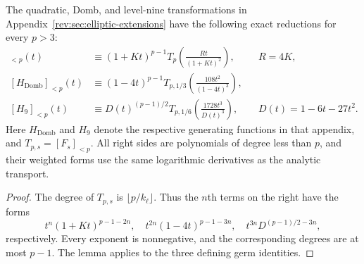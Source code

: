 \begin{proposition}
\label{prop:three-finite-transformations}
The quadratic, Domb, and level-nine transformations in
Appendix~\ref{rev:sec:elliptic-extensions} have the following exact
reductions for every $p>3$:
\begin{align}
 [\mathcal G]_{<p}(t)
 &\equiv(1+Kt)^{p-1}T_p\!\left(\frac{Rt}{(1+Kt)^2}\right),
 &&R=4K,\label{eq:finite-quadratic}\\
 [H_{\mathrm{Domb}}]_{<p}(t)
 &\equiv(1-4t)^{p-1}T_{p,1/3}\!\left(\frac{108t^2}{(1-4t)^3}\right),
 \label{eq:finite-domb}\\
 [H_9]_{<p}(t)
 &\equiv D(t)^{(p-1)/2}T_{p,1/6}\!\left(\frac{1728t^3}{D(t)^3}\right),
 &&D(t)=1-6t-27t^2.\label{eq:finite-nine}
\end{align}
Here $H_{\mathrm{Domb}}$ and $H_9$ denote the respective generating
functions in that appendix, and $T_{p,s}=[F_s]_{<p}$.
All right sides are polynomials of degree less than $p$, and their
weighted forms use the same logarithmic derivatives as the analytic
transport.
\end{proposition}
\begin{proof}
The degree of $T_{p,s}$ is $\lfloor p/k_\ell\rfloor$. Thus the
$n$th terms on the right have the forms
\[
 t^n(1+Kt)^{p-1-2n},\quad
 t^{2n}(1-4t)^{p-1-3n},\quad
 t^{3n}D^{(p-1)/2-3n},
\]
respectively. Every exponent is nonnegative, and the corresponding
degrees are at most $p-1$. The lemma applies to the three defining
germ identities.
\end{proof}

